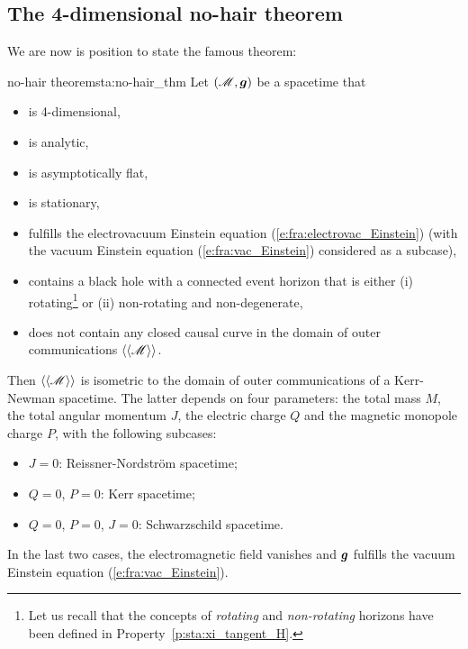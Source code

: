 \subsection{The 4-dimensional no-hair theorem} \label{s:sta:the_no-hair_thm}

We are now is position to state the famous theorem:
\begin{tprop}{no-hair theorem}{sta:no-hair_thm}
Let $(\mathscr{M},\bm{g})$ be a spacetime that
\begin{itemize}
\item is 4-dimensional,
\item is analytic,
\item is asymptotically flat,
\item is stationary,
\item fulfills the electrovacuum Einstein equation (\ref{e:fra:electrovac_Einstein}) (with the vacuum Einstein equation (\ref{e:fra:vac_Einstein}) considered as a subcase),
\item contains a black hole with a connected event horizon
that is either (i) rotating\footnote{Let us recall that
the concepts of \emph{rotating} and \emph{non-rotating} horizons
have been defined in Property~\ref{p:sta:xi_tangent_H}.}
 or (ii) non-rotating and non-degenerate,
\item does not contain any closed causal curve in the domain of outer
communications $\langle\langle \mathscr{M}\rangle\rangle$.
\end{itemize}
Then $\langle\langle \mathscr{M}\rangle\rangle$ is isometric
to the domain of outer communications of a Kerr-Newman spacetime.
The latter depends on four parameters: the total mass $M$, the
total angular momentum $J$, the electric charge $Q$ and the magnetic
monopole charge $P$, with the following subcases:
\begin{itemize}
\item $J=0$: Reissner-Nordström spacetime;
\item $Q=0$, $P=0$: Kerr spacetime;
\item $Q=0$, $P=0$, $J=0$: Schwarzschild spacetime.
\end{itemize}
In the last two cases, the electromagnetic field vanishes and $\bm{g}$
fulfills the vacuum Einstein equation (\ref{e:fra:vac_Einstein}).
\end{tprop}

